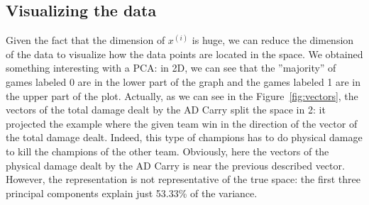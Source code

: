\documentclass{article}
\begin{document}
\subsection{Visualizing the data}

Given the fact that the dimension of $x^{(i)}$ is huge, we can reduce the dimension of the data to visualize how the data points are located in the space. We obtained something interesting with a PCA: in 2D, we can see that the ''majority'' of games labeled 0 are in the lower part of the graph and the games labeled 1 are in the upper part of the plot. Actually, as we can see in the Figure~\ref{fig:vectors}, the vectors  of the total damage dealt by the AD Carry split the space in 2: it projected the example where the given team win in the direction of the vector of the total damage dealt.  Indeed, this type of champions has to do physical damage to kill the champions of the other team. Obviously, here the vectors of the physical damage dealt by the AD Carry is near the previous described vector. However, the representation is not representative of the true space: the first three principal components explain just 53.33\% of the variance.
\end{document}
